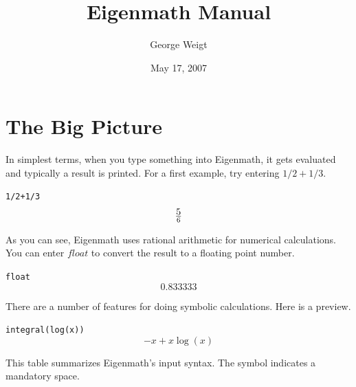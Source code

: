 \documentclass[12pt]{book}
\title{Eigenmath Manual}
\author{George Weigt}
\date{May 17, 2007}
\begin{document}
\maketitle
\tableofcontents

\newpage

\chapter{The Big Picture}
In simplest terms, when you type something into Eigenmath,
it gets evaluated and typically a result is printed.
For a first example, try entering $1/2+1/3$.

\medskip
\verb$1/2+1/3$
$$5\over6$$

\medskip
\noindent
As you can see, Eigenmath uses rational arithmetic for numerical calculations.
You can enter $float$ to convert the result to a floating point number.

\medskip
\verb$float$
$$0.833333$$

\medskip
\noindent
There are a number of features for doing symbolic calculations.
Here is a preview.

\medskip
\verb$integral(log(x))$
$$-x+x\log(x)$$

\newpage

\noindent
This table summarizes Eigenmath's input syntax.
The symbol {\tt{}} indicates a mandatory space.
\end{document}
